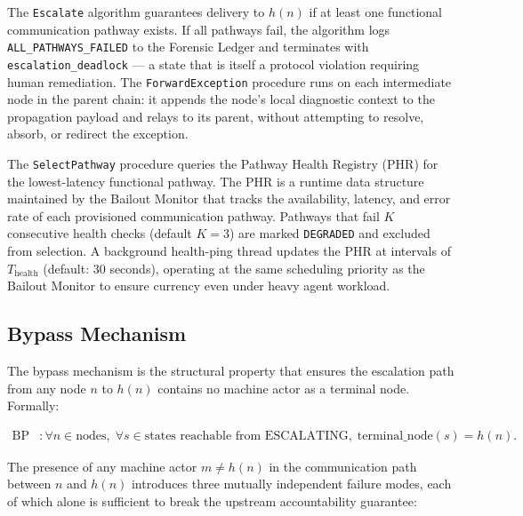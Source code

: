 The \texttt{Escalate} algorithm guarantees delivery to $h(n)$ if at least one functional communication pathway exists. If all pathways fail, the algorithm logs \texttt{ALL\_PATHWAYS\_FAILED} to the Forensic Ledger and terminates with \texttt{escalation\_deadlock} — a state that is itself a protocol violation requiring human remediation. The \texttt{ForwardException} procedure runs on each intermediate node in the parent chain: it appends the node's local diagnostic context to the propagation payload and relays to its parent, without attempting to resolve, absorb, or redirect the exception.

The \texttt{SelectPathway} procedure queries the Pathway Health Registry (PHR) for the lowest-latency functional pathway. The PHR is a runtime data structure maintained by the Bailout Monitor that tracks the availability, latency, and error rate of each provisioned communication pathway. Pathways that fail $K$ consecutive health checks (default $K = 3$) are marked \texttt{DEGRADED} and excluded from selection. A background health-ping thread updates the PHR at intervals of $T_{\text{health}}$ (default: 30 seconds), operating at the same scheduling priority as the Bailout Monitor to ensure currency even under heavy agent workload.

\subsection{Bypass Mechanism}\label{sec:bypass-mechanism}

The bypass mechanism is the structural property that ensures the escalation path from any node $n$ to $h(n)$ contains no machine actor as a terminal node. Formally:

\begin{align}
\text{BP} &: \forall n \in \text{nodes},\; \forall s \in \text{states reachable from ESCALATING},\; \text{terminal\_node}(s) = h(n). \tag{BP}
\end{align}

The presence of any machine actor $m \neq h(n)$ in the communication path between $n$ and $h(n)$ introduces three mutually independent failure modes, each of which alone is sufficient to break the upstream accountability guarantee:

